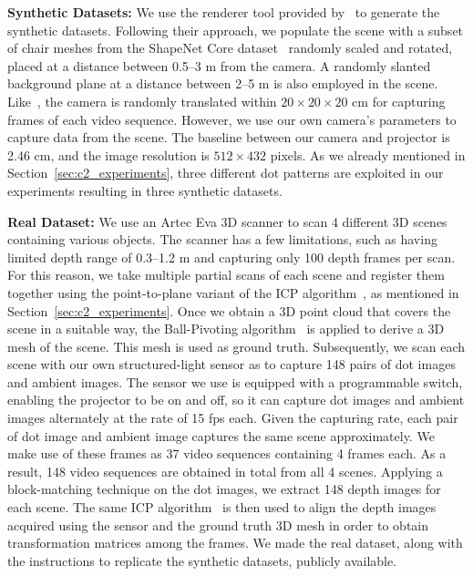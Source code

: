 \noindent\textbf{Synthetic Datasets:} We use the renderer tool provided by~\cite{riegler2019connecting} to generate the synthetic datasets. Following their approach, we populate the scene with a subset of chair meshes from the ShapeNet Core dataset~\citep{shapenet2015} randomly scaled and rotated, placed at a distance between 0.5--3 m from the camera. A randomly slanted background plane at a distance between 2--5 m is also employed in the scene. Like~\cite{riegler2019connecting}, the camera is randomly translated within $20 \times 20 \times 20$ cm for capturing frames of each video sequence. However, we use our own camera's parameters to capture data from the scene. The baseline between our camera and projector is 2.46 cm, and the image resolution is $512 \times 432$ pixels. As we already mentioned in Section~\ref{sec:c2_experiments}, three different dot patterns are exploited in our experiments resulting in three synthetic datasets.

\bigbreak\noindent\textbf{Real Dataset:} We use an Artec Eva 3D scanner to scan 4 different 3D scenes containing various objects. The scanner has a few limitations, such as having limited depth range of 0.3--1.2 m and capturing only 100 depth frames per scan. For this reason, we take multiple partial scans of each scene and register them together using the point-to-plane variant of the ICP algorithm~\citep{rusinkiewicz2001efficient}, as mentioned in Section~\ref{sec:c2_experiments}. Once we obtain a 3D point cloud that covers the scene in a suitable way, the Ball-Pivoting algorithm~\citep{bernardini99ball} is applied to derive a 3D mesh of the scene. This mesh is used as ground truth. Subsequently, we scan each scene with our own structured-light sensor as to capture 148 pairs of dot images and ambient images. The sensor we use is equipped with a programmable switch, enabling the projector to be on and off, so it can capture dot images and ambient images alternately at the rate of 15 fps each. Given the capturing rate, each pair of dot image and ambient image captures the same scene approximately. We make use of these frames as 37 video sequences containing 4 frames each. As a result, 148 video sequences are obtained in total from all 4 scenes. Applying a block-matching technique on the dot images, we extract 148 depth images for each scene. The same ICP algorithm~\citep{rusinkiewicz2001efficient} is then used to align the depth images acquired using the sensor and the ground truth 3D mesh in order to obtain transformation matrices among the frames. We made the real dataset, along with the instructions to replicate the synthetic datasets, publicly available.

